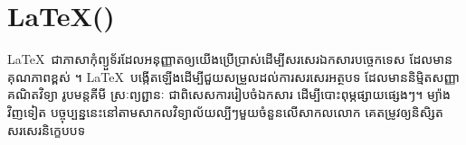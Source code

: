 \documentclass[11pt, a5paper]{article}
\begin{document}
	\section*{\centering \LaTeX ()}
	\quad\LaTeX~ជាភាសាកុំព្យួទ័រដែលអនុញ្ញាតឲ្យយើងប្រើប្រាស់ដើម្បីសរសេរឯកសារបច្ចេកទេស ដែលមានគុណភាពខ្ពស់ ។ \LaTeX~បង្កើតឡើងដើម្បីជួយសម្រួលដល់ការសរសេរអត្ថបទ ដែលមាននិម្មិតសញ្ញាគណិតវិទ្យា រូបមន្តគីមី ស្រៈព្យព្ជានៈ ជាពិសេសការរៀបចំឯកសារ ដើម្បីបោះពុម្ភផ្សាយផ្សេងៗ។ ម្យ៉ាងវិញទៀត បច្ចុប្បន្ននេះនៅតាមសាកលវិទ្យាល័យល្បីៗមួយចំនួនលើសាកលលោក គេតម្រូវឲ្យនិសិ្សតសរសេរនិក្ខេបបទ
\end{document}
